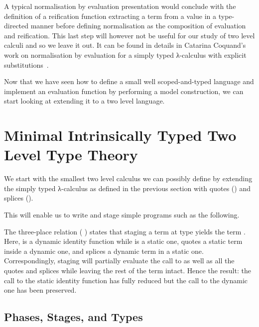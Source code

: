 \begin{AgdaSuppressSpace}
\end{AgdaSuppressSpace}

A typical normalisation by evaluation presentation would
conclude with the definition of a reification function
extracting a term from a value in a type-directed manner
before defining normalisation as the composition of evaluation
and reification.
%
This last step will however not be useful for our study of two
level calculi and so we leave it out. It can be found in details
in Catarina Coquand's work on normalisation by evaluation for
a simply typed λ-calculus with explicit
substitutions~\cite{DBLP:journals/lisp/Coquand02}.

Now that we have seen how to define a small well scoped-and-typed
language and implement an evaluation function by performing a model
construction, we can start looking at extending it to a two level
language.

\section{Minimal Intrinsically Typed Two Level Type Theory}

We start with the smallest two level calculus we can possibly define
by extending the simply typed λ-calculus as defined in the previous
section with quotes () and splices ().

This will enable us to write and stage simple programs such as the following.


The three-place relation (    ) states
that staging a term  at type  yields the term .
%
Here,  is a dynamic identity function
while  is a static one,
 quotes a static term inside a dynamic one,
and  splices a dynamic term in a static one.
%
Correspondingly, staging will partially evaluate the call to
 as well as all the quotes and splices while leaving
the rest of the term intact.
%
Hence the result: the call to the static identity function has
fully reduced but the call to the dynamic one has been preserved.


\subsection{Phases, Stages, and Types}

